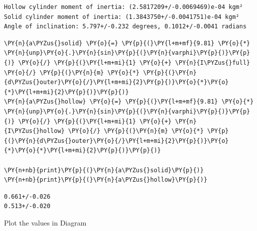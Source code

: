     \begin{Verbatim}[commandchars=\\\{\}]
Hollow cylinder moment of inertia: (2.5817209+/-0.0069469)e-04 kgm²
Solid cylinder moment of inertia: (1.3843750+/-0.0041751)e-04 kgm²
Angle of inclination: 5.797+/-0.232 degrees, 0.1012+/-0.0041 radians
    \end{Verbatim}

    \begin{tcolorbox}[breakable, size=fbox, boxrule=1pt, pad at break*=1mm,colback=cellbackground, colframe=cellborder]
\begin{Verbatim}[commandchars=\\\{\}]
\PY{n}{a\PYZus{}solid} \PY{o}{=} \PY{p}{(}\PY{l+m+mf}{9.81} \PY{o}{*} \PY{n}{unp}\PY{o}{.}\PY{n}{sin}\PY{p}{(}\PY{n}{varphi}\PY{p}{)}\PY{p}{)} \PY{o}{/} \PY{p}{(}\PY{l+m+mi}{1} \PY{o}{+} \PY{n}{I\PYZus{}full} \PY{o}{/} \PY{p}{(}\PY{n}{m} \PY{o}{*} \PY{p}{(}\PY{n}{d\PYZus{}outer}\PY{o}{/}\PY{l+m+mi}{2}\PY{p}{)}\PY{o}{*}\PY{o}{*}\PY{l+m+mi}{2}\PY{p}{)}\PY{p}{)}
\PY{n}{a\PYZus{}hollow} \PY{o}{=} \PY{p}{(}\PY{l+m+mf}{9.81} \PY{o}{*} \PY{n}{unp}\PY{o}{.}\PY{n}{sin}\PY{p}{(}\PY{n}{varphi}\PY{p}{)}\PY{p}{)} \PY{o}{/} \PY{p}{(}\PY{l+m+mi}{1} \PY{o}{+} \PY{n}{I\PYZus{}hollow} \PY{o}{/} \PY{p}{(}\PY{n}{m} \PY{o}{*} \PY{p}{(}\PY{n}{d\PYZus{}outer}\PY{o}{/}\PY{l+m+mi}{2}\PY{p}{)}\PY{o}{*}\PY{o}{*}\PY{l+m+mi}{2}\PY{p}{)}\PY{p}{)}

\PY{n+nb}{print}\PY{p}{(}\PY{n}{a\PYZus{}solid}\PY{p}{)}
\PY{n+nb}{print}\PY{p}{(}\PY{n}{a\PYZus{}hollow}\PY{p}{)}
\end{Verbatim}
\end{tcolorbox}

    \begin{Verbatim}[commandchars=\\\{\}]
0.661+/-0.026
0.513+/-0.020
    \end{Verbatim}

    Plot the values in Diagram

